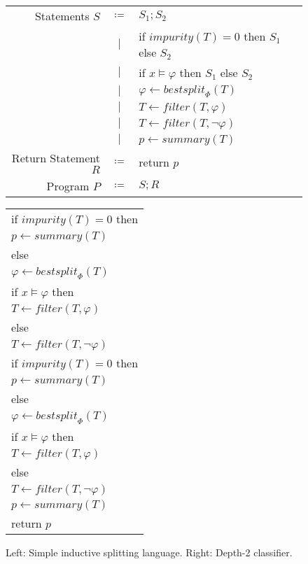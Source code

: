 \begin{figure}
\begin{minipage}{0.65\textwidth}
\centering
\begin{tabular}{rcl}
Statements $S$ & $\coloneqq$ & $S_1 ; S_2$ \\
& $\mid$ & if $\mathit{impurity}(T) = 0$ then $S_1$ else $S_2$ \\
& $\mid$ & if $x \models \varphi$ then $S_1$ else $S_2$ \\
& $\mid$ & $\varphi \gets \mathit{bestsplit}_\Phi(T)$ \\
& $\mid$ & $T \gets \mathit{filter}(T, \varphi)$ \\
& $\mid$ & $T \gets \mathit{filter}(T, \lnot \varphi)$ \\
& $\mid$ & $p \gets \mathit{summary}(T)$ \\
Return Statement $R$ & $\coloneqq$ & return $p$ \\
Program $P$ & $\coloneqq$ & $S ; R$
\end{tabular}
\end{minipage}
%
\begin{minipage}{0.3\textwidth}
\centering
\begin{tabular}{l}
if $\mathit{impurity}(T) = 0$ then \\
\quad $p \gets \mathit{summary}(T)$ \\
else \\
\quad $\varphi \gets \mathit{bestsplit}_\Phi(T)$ \\
\quad if $x \models \varphi$ then \\
\qquad $T \gets \mathit{filter}(T, \varphi)$ \\
\quad else \\
\qquad $T \gets \mathit{filter}(T, \lnot\varphi)$ \\
\quad if $\mathit{impurity}(T) = 0$ then \\
\qquad $p \gets \mathit{summary}(T)$ \\
\quad else \\
\qquad $\varphi \gets \mathit{bestsplit}_\Phi(T)$ \\
\qquad if $x \models \varphi$ then \\
\qquad\quad $T \gets \mathit{filter}(T, \varphi)$ \\
\qquad else \\
\qquad\quad $T \gets \mathit{filter}(T, \lnot \varphi)$ \\
\qquad $p \gets \mathit{summary}(T)$ \\
return $p$
\end{tabular}
\end{minipage}
\caption{Left: Simple inductive splitting language.
Right: Depth-2 classifier.}
\label{fig:dsl}
\end{figure}

